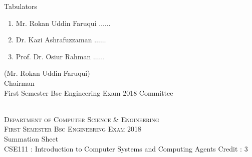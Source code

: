 \documentclass[12pt]{article}
\begin{document}
            \begin{table}[hb]
            	\centering
            \begin{minipage}[b]{0.5\linewidth} %
            {\centering Tabulators }
            \begin{enumerate}
                \item Mr. Rokan Uddin Faruqui \hspace*{1ex} $\ldots \ldots  $  
                \item Dr. Kazi Ashrafuzzaman \hspace*{1ex} $\ldots \ldots  $  
                \item Prof. Dr. Osiur Rahman \hspace*{1ex} $\ldots \ldots $  
            \end{enumerate} 

            \end{minipage}
            \hspace*{1.2cm}
            \begin{minipage}[b]{0.4\linewidth} \centering
            (Mr. Rokan Uddin Faruqui) \\
            Chairman  \hspace*{1ex} \\
           First Semester Bsc Engineering Exam 2018 Committee
            \end{minipage}
            \end{table}
            \clearpage
    \centering
    \begin{minipage}[m]{.8\textwidth} \centering 
	\smallskip
	\\
	\textsc{Department of Computer Science \& Engineering}\\
	\textsc{ First Semester Bsc Engineering Exam 2018}\\
    {\large {\sc Summation Sheet}}\\  
     {\centering CSE111 : Introduction to Computer Systems and Computing Agents     Credit : 3 } \\
    \end{minipage} 
\end{document}
